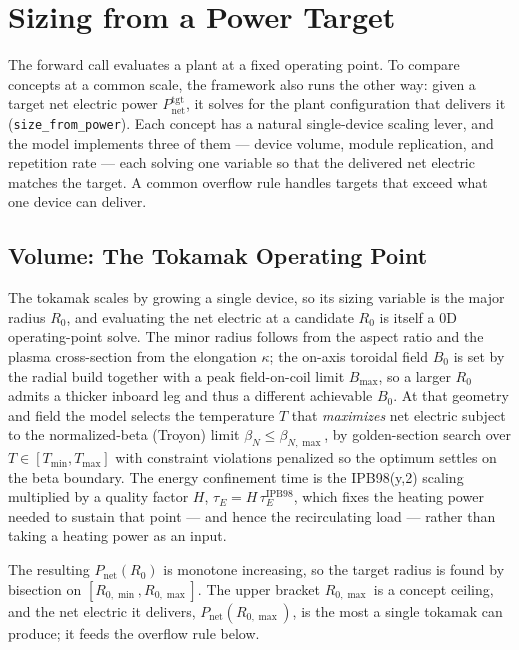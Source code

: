 \documentclass{article}
\begin{document}
\section{Sizing from a Power Target}
\label{sec:sizing}
The forward call evaluates a plant at a fixed operating point. To compare
concepts at a common scale, the framework also runs the other way: given a
target net electric power $P_{\text{net}}^{\text{tgt}}$, it solves for the plant
configuration that delivers it (\texttt{size\_from\_power}). Each concept has a
natural single-device scaling lever, and the model implements three of them ---
device volume, module replication, and repetition rate --- each solving one
variable so that the delivered net electric matches the target. A common
overflow rule handles targets that exceed what one device can deliver.

\subsection{Volume: The Tokamak Operating Point}
The tokamak scales by growing a single device, so its sizing variable is the
major radius $R_0$, and evaluating the net electric at a candidate $R_0$ is
itself a 0D operating-point solve. The minor radius follows from the aspect
ratio and the plasma cross-section from the elongation $\kappa$; the on-axis
toroidal field $B_0$ is set by the radial build together with a peak
field-on-coil limit $B_{\max}$, so a larger $R_0$ admits a thicker inboard leg
and thus a different achievable $B_0$. At that geometry and field the model
selects the temperature $T$ that \emph{maximizes} net electric subject to the
normalized-beta (Troyon) limit $\beta_N \le \beta_{N,\max}$, by golden-section
search over $T \in [T_{\min}, T_{\max}]$ with constraint violations penalized so
the optimum settles on the beta boundary. The energy confinement time is the
IPB98(y,2) scaling multiplied by a quality factor $H$,
$\tau_E = H\,\tau_E^{\text{IPB98}}$, which fixes the heating power needed to
sustain that point --- and hence the recirculating load --- rather than taking a
heating power as an input.

The resulting $P_{\text{net}}(R_0)$ is monotone increasing, so the target radius
is found by bisection on $[R_{0,\min}, R_{0,\max}]$. The upper bracket
$R_{0,\max}$ is a concept ceiling, and the net electric it delivers,
$P_{\text{net}}(R_{0,\max})$, is the most a single tokamak can produce; it feeds
the overflow rule below.
\end{document}
